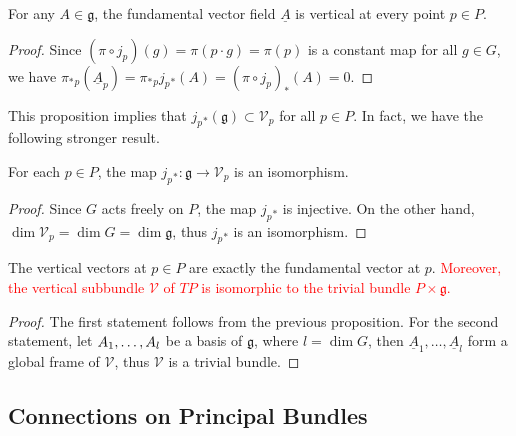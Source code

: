 \begin{proposition}
    For any $A\in\mathfrak{g}$, the fundamental vector field $\underline{A}$ is vertical at every point $p\in P$.
\end{proposition}
\begin{proof}
    Since $(\pi\circ j_p)(g) = \pi(p\cdot g) = \pi(p)$ is a constant map for all $g\in G$, 
    we have $\pi_*{}_p(\underline{A}_p) = \pi_*{}_p j_p{}_*(A) = (\pi\circ j_p)_*(A)= 0$.
\end{proof}
This proposition implies that $j_p{}_*(\mathfrak{g})\subset \mathcal{V}_p$ for all $p\in P$. 
In fact, we have the following stronger result.
\begin{proposition}
    For each $p\in P$, the map $j_p{}_*: \mathfrak{g} \to \mathcal{V}_p$ is an isomorphism.
\end{proposition}
\begin{proof}
    Since $G$ acts freely on $P$, the map $j_p{}_*$ is injective. On the other hand, 
    $\dim \mathcal{V}_p = \dim G = \dim \mathfrak{g}$, thus $j_p{}_*$ is an isomorphism.
\end{proof}
\begin{corollary}
    The vertical vectors at $p\in P$ are exactly the fundamental vector at $p$. 
    \textcolor{red}{Moreover, the vertical subbundle $\mathcal{V}$ of $TP$ 
    is isomorphic to the trivial bundle $P\times\mathfrak{g}$.}
\end{corollary}
\begin{proof}
    The first statement follows from the previous proposition. For the second statement, 
    let ${A}_{1},\dots,{A}_{l}$ be a basis of $\mathfrak{g}$, where $l = \dim G$, 
    then $\underline{A}_1, \ldots, \underline{A}_l$ form a global frame of $\mathcal{V}$, 
    thus $\mathcal{V}$ is a trivial bundle. 
\end{proof}

\subsection{Connections on Principal Bundles}
